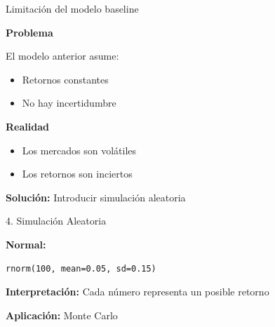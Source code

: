 \documentclass[10pt]{beamer}
\begin{document}
\begin{frame}{Limitación del modelo baseline}

\textbf{Problema}

\vspace{0.3cm}
El modelo anterior asume:

\begin{itemize}
\item Retornos constantes
\item No hay incertidumbre
\end{itemize}

\vspace{0.4cm}

\textbf{Realidad}

\begin{itemize}
\item Los mercados son volátiles
\item Los retornos son inciertos
\end{itemize}

\vspace{0.4cm}

\textbf{Solución:}
Introducir simulación aleatoria

\end{frame}
\begin{frame}[fragile]{4. Simulación Aleatoria}

\textbf{Normal:}

\begin{verbatim}
rnorm(100, mean=0.05, sd=0.15)
\end{verbatim}

\vspace{0.3cm}

\textbf{Interpretación:}
Cada número representa un posible retorno

\vspace{0.3cm}

\textbf{Aplicación:}
Monte Carlo

\end{frame}
\end{document}
